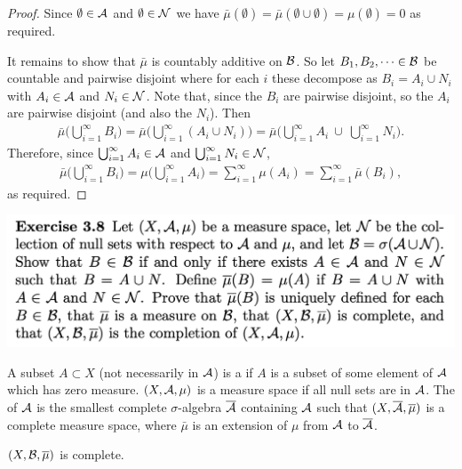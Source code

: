\begin{proof}
  Since $\emptyset \in \mathcal A$ and $\emptyset \in \mathcal N$ we
  have $\bar\mu(\emptyset) = \bar\mu(\emptyset \cup \emptyset) = \mu(\emptyset) = 0$ as required.

  It remains to show that $\bar\mu$ is countably additive on $\mathcal B$. So let $B_1, B_2, \dots \in \mathcal B$ be
  countable and pairwise disjoint where for each $i$ these decompose as $B_i = A_i \cup N_i$
  with $A_i \in \mathcal A$ and $N_i \in \mathcal N$. Note that, since the $B_i$ are pairwise disjoint, so the $A_i$ are
  pairwise disjoint (and also the $N_i$). Then
  \begin{align*}
    \bar\mu\Big(\bigcup_{i=1}^\infty B_i\Big)
    = \bar\mu\Big(\bigcup_{i=1}^\infty (A_i \cup N_i)\Big)
    = \bar\mu\Big(\bigcup_{i=1}^\infty A_i ~\cup~ \bigcup_{i=1}^\infty N_i\Big).
  \end{align*}
  Therefore, since $\bigcup_{i=1}^\infty A_i \in \mathcal A$ and $\bigcup_{i=1}^\infty N_i \in \mathcal N$,
  \begin{align*}
    \bar\mu\Big(\bigcup_{i=1}^\infty B_i\Big)
    = \mu\Big(\bigcup_{i=1}^\infty A_i\Big)
    = \sum_{i=1}^\infty \mu(A_i)
    = \sum_{i=1}^\infty \bar\mu(B_i),
  \end{align*}
  as required.
\end{proof}

\includegraphics[width=400pt]{img/analysis--berkeley-202a-hw04-c88b.png}

\begin{remark*}
  A subset $A \subset X$ (not necessarily in $\mathcal A$) is a  if $A$ is a subset of some element of
  $\mathcal A$ which has zero measure. $(X, \mathcal A, \mu)$ is a  measure space if all null sets are in
  $\mathcal A$. The  of $\mathcal A$ is the smallest complete $\sigma$-algebra $\overline{\mathcal A}$ containing
  $\mathcal A$ such that $(X, \overline{\mathcal A}, \overline \mu)$ is a complete measure space, where $\bar \mu$ is an extension
  of $\mu$ from $\mathcal A$ to $\overline{\mathcal A}$.
\end{remark*}

\begin{claim*}
  $(X, \mathcal B, \overline{\mu})$ is complete.
\end{claim*}


